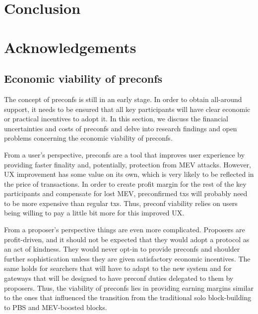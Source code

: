 \documentclass[a4paper]{article}
\theoremstyle{boldstyle}
\begin{document}
\section{Conclusion}

\section*{Acknowledgements}




\newpage

% 


% 

\appendix
\subsection{Economic viability of preconfs} 
    The concept of preconfs is still in an early stage. In order to obtain all-around support, it needs to be ensured that all key participants will have clear economic or practical incentives to adopt it. In this section, we discuss the financial uncertainties and costs of preconfs and delve into research findings and open problems concerning the economic viability of preconfs. 
    
    From a user's perspective, preconfs are a tool that improves user experience by providing faster finality and, potentially, protection from MEV attacks. However, UX improvement has some value on its own, which is very likely to be reflected in the price of transactions. In order to create profit margin for the rest of the key participants and compensate for lost MEV, preconfirmed txs will probably need to be more expensive than regular txs. Thus, preconf viability relies on users being willing to pay a little bit more for this improved UX. 

    From a proposer's perspective things are even more complicated. Proposers are profit-driven, and it should not be expected that they would adopt a protocol as an act of kindness. They would never opt-in to provide preconfs and shoulder further sophistication unless they are given satisfactory economic incentives. The same holds for searchers that will have to adapt to the new system and for gateways that will be designed to have preconf duties delegated to them by proposers. Thus, the viability of preconfs lies in providing earning margins similar to the ones that influenced the transition from the traditional solo block-building to PBS and MEV-boosted blocks.
\end{document}
